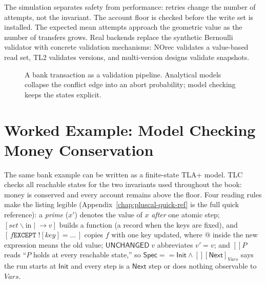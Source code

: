 The simulation separates safety from performance: retries change the number of attempts, not the invariant. The account floor is checked before the write set is installed. The expected mean attempts approach the geometric value as the number of transfers grows. Real backends replace the synthetic Bernoulli validator with concrete validation mechanisms: NOrec validates a value-based read set, TL2 validates versions, and multi-version designs validate snapshots.

\begin{figure}[htbp]
\centering
{}
\caption{A bank transaction as a validation pipeline. Analytical models collapse the conflict edge into an abort probability; model checking keeps the states explicit.}
\label{fig:bank-validation-pipeline}
\end{figure}

\section{Worked Example: Model Checking Money Conservation}
\label{sec:math-bank-tla}

The same bank example can be written as a finite-state TLA+ model. TLC checks all reachable states for the two invariants used throughout the book: money is conserved and every account remains above the floor. Four reading rules make the listing legible (Appendix~\ref{chap:pluscal-quick-ref} is the full quick reference): a \emph{prime} ($x'$) denotes the value of $x$ \emph{after} one atomic step; $[\mathit{set} \backslash\mathrm{in} \mid\!\to v]$ builds a function (a record when the keys are fixed), and $[\,f \mathbin{\texttt{EXCEPT}}\; ![\mathit{key}] = \dots\,]$ copies $f$ with one key updated, where $@$ inside the new expression means the old value; $\mathsf{UNCHANGED}\; v$ abbreviates $v' = v$; and $[]P$ reads ``$P$ holds at every reachable state,'' so $\mathsf{Spec} == \mathsf{Init} \wedge [][\mathsf{Next}]_\mathit{Vars}$ says the run starts at $\mathsf{Init}$ and every step is a $\mathsf{Next}$ step or does nothing observable to $\mathit{Vars}$.

